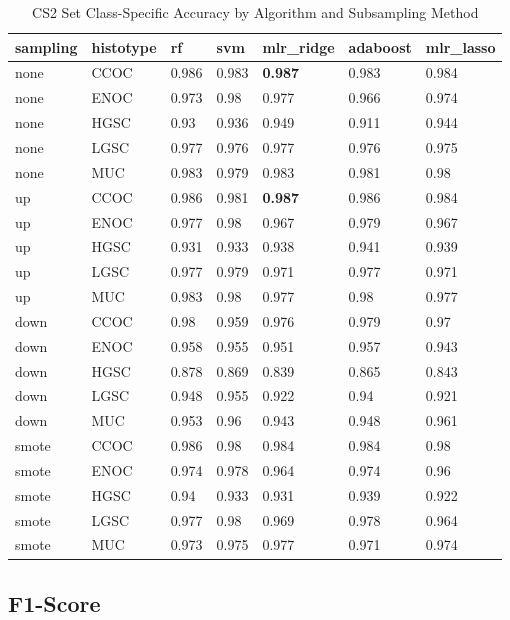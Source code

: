 \documentclass[
]{report}
\begin{document}
\begin{table}

\caption{\label{tab:cs2-accuracy-class-table}CS2 Set Class-Specific Accuracy by Algorithm and Subsampling Method}
\centering
\begin{tabular}[t]{l|l|l|l|l|l|l}
\hline
sampling & histotype & rf & svm & mlr\_ridge & adaboost & mlr\_lasso\\
\hline
none & CCOC & 0.986 & 0.983 & \textbf{0.987} & 0.983 & 0.984\\
\hline
none & ENOC & 0.973 & 0.98 & 0.977 & 0.966 & 0.974\\
\hline
none & HGSC & 0.93 & 0.936 & 0.949 & 0.911 & 0.944\\
\hline
none & LGSC & 0.977 & 0.976 & 0.977 & 0.976 & 0.975\\
\hline
none & MUC & 0.983 & 0.979 & 0.983 & 0.981 & 0.98\\
\hline
up & CCOC & 0.986 & 0.981 & \textbf{0.987} & 0.986 & 0.984\\
\hline
up & ENOC & 0.977 & 0.98 & 0.967 & 0.979 & 0.967\\
\hline
up & HGSC & 0.931 & 0.933 & 0.938 & 0.941 & 0.939\\
\hline
up & LGSC & 0.977 & 0.979 & 0.971 & 0.977 & 0.971\\
\hline
up & MUC & 0.983 & 0.98 & 0.977 & 0.98 & 0.977\\
\hline
down & CCOC & 0.98 & 0.959 & 0.976 & 0.979 & 0.97\\
\hline
down & ENOC & 0.958 & 0.955 & 0.951 & 0.957 & 0.943\\
\hline
down & HGSC & 0.878 & 0.869 & 0.839 & 0.865 & 0.843\\
\hline
down & LGSC & 0.948 & 0.955 & 0.922 & 0.94 & 0.921\\
\hline
down & MUC & 0.953 & 0.96 & 0.943 & 0.948 & 0.961\\
\hline
smote & CCOC & 0.986 & 0.98 & 0.984 & 0.984 & 0.98\\
\hline
smote & ENOC & 0.974 & 0.978 & 0.964 & 0.974 & 0.96\\
\hline
smote & HGSC & 0.94 & 0.933 & 0.931 & 0.939 & 0.922\\
\hline
smote & LGSC & 0.977 & 0.98 & 0.969 & 0.978 & 0.964\\
\hline
smote & MUC & 0.973 & 0.975 & 0.977 & 0.971 & 0.974\\
\hline
\end{tabular}
\end{table}

\hypertarget{f1-score-3}{%
\subsection{F1-Score}\label{f1-score-3}}
\end{document}
